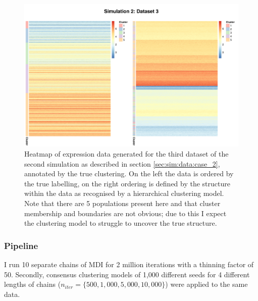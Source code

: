 \documentclass[14pt]{extarticle} %
\begin{document}
	\begin{figure} %
		\centering
		\includegraphics[scale=0.7]{Images/Gen_data/Case_2/dataset_3_comp_clustered_unclustered.png}
		\caption{Heatmap of expression data generated for the third dataset of the second simulation as described in section \ref{sec:sim:data:case_2}, annotated by the true clustering. On the left the data is ordered by the true labelling, on the right ordering is defined by the structure within the data as recognised by a hierarchical clustering model. Note that there are 5 populations present here and that cluster membership and boundaries are not obvious; due to this I expect the clustering model to struggle to uncover the true structure.}
		\label{fig:gen_data_3_sim_case_2}
	\end{figure}


	\subsubsection{Pipeline} \label{sec:simulation_pipeline}
	I run 10 separate chains of MDI for 2 million iterations with a thinning factor of 50. Secondly, consensus clustering models of 1,000 different seeds for 4 different lengths of chains ($n_{iter} = \{500, 1,000, 5,000, 10,000\}$) were applied to the same data.
	
\end{document}
